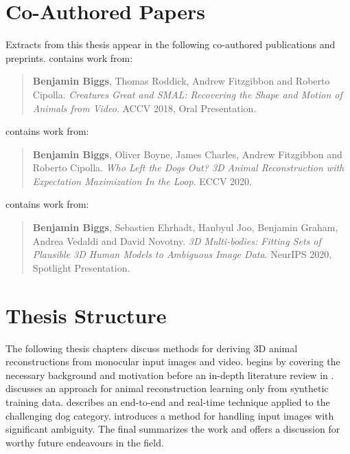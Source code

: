 \section{Co-Authored Papers}  %

Extracts from this thesis appear in the following co-authored publications and preprints.  contains work from:

\begin{quote}
    \textbf{Benjamin Biggs}, Thomas Roddick, Andrew Fitzgibbon and Roberto Cipolla. \emph{Creatures Great and SMAL: Recovering the Shape and Motion of Animals from Video}. ACCV 2018, Oral Presentation.
\end{quote}

\noindent{} contains work from:

\begin{quote}
    \textbf{Benjamin Biggs}, Oliver Boyne, James Charles, Andrew Fitzgibbon and Roberto Cipolla. \emph{Who Left the Dogs Out? 3D Animal Reconstruction with Expectation Maximization In the Loop}. ECCV 2020.
\end{quote}

\noindent
{} contains work from:

\begin{quote}
    \textbf{Benjamin Biggs}, Sebastien Ehrhadt, Hanbyul Joo, Benjamin Graham, Andrea Vedaldi and David Novotny. \emph{3D Multi-bodies: Fitting Sets of Plausible 3D Human Models to Ambiguous Image Data}. NeurIPS 2020, Spotlight Presentation.
\end{quote}

\section{Thesis Structure}  %

The following thesis chapters discuss methods for deriving 3D animal reconstructions from monocular input images and video.  begins by covering the necessary background and motivation before an in-depth literature review in .  discusses an approach for animal reconstruction learning only from synthetic training data.  describes an end-to-end and real-time technique applied to the challenging dog category.  introduces a method for handling input images with significant ambiguity. The final  summarizes the work and offers a discussion for worthy future endeavours in the field.